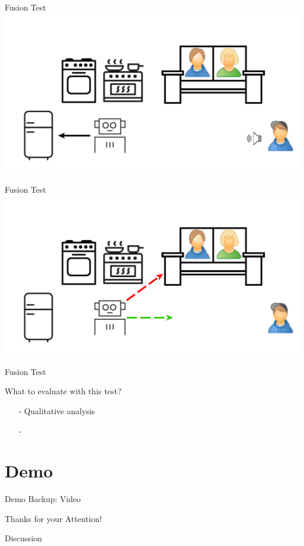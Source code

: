 \documentclass{beamer}
\begin{document}
	\begin{frame}{Fusion Test}
		\centering
		\includegraphics[width=.75\textwidth]{Bilder/fusion_test_1}
	\end{frame}
	
	\begin{frame}{Fusion Test}
		\centering
		\includegraphics[width=.75\textwidth]{Bilder/fusion_test_2}
	\end{frame}
	
	\begin{frame}{Fusion Test}
		\begin{alertblock}{What to evaluate with this test?}
			\pause
			\begin{itemize}
				\item[-] Qualitative analysis 
				\item[-] 
			\end{itemize}
		\end{alertblock}
	\end{frame}
	
	
	
	
	
	\section{Demo}
	
	\begin{frame}{Demo Backup: Video}
	\end{frame}
	
	
	
	\begin{frame}{}
		\begin{alertblock}{Thanks for your Attention!}
		\end{alertblock}
	\end{frame}
	
	\begin{frame}{}
		\begin{alertblock}{Discussion}
		\end{alertblock}
	\end{frame}
	
\end{document}
